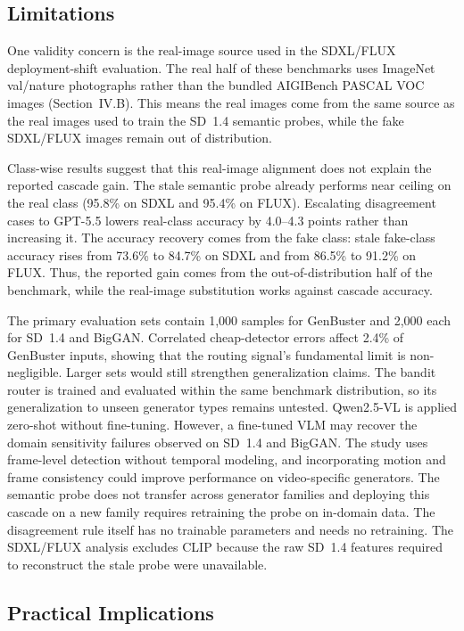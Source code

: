 \documentclass{ieeeaccess}
\begin{document}
\subsection{Limitations}

One validity concern is the real-image source used in the SDXL/FLUX deployment-shift
evaluation. The real half of these benchmarks uses ImageNet val/nature photographs
rather than the bundled AIGIBench PASCAL VOC images (Section~IV.B). This means the real
images come from the same source as the real images used to train the SD~1.4 semantic
probes, while the fake SDXL/FLUX images remain out of distribution.

Class-wise results suggest that this real-image alignment does not explain the reported
cascade gain. The stale semantic probe already performs near ceiling on the real class
(95.8\% on SDXL and 95.4\% on FLUX). Escalating disagreement cases to GPT-5.5 lowers
real-class accuracy by 4.0--4.3 points rather than increasing it. The accuracy recovery
comes from the fake class: stale fake-class accuracy rises from 73.6\% to 84.7\% on SDXL
and from 86.5\% to 91.2\% on FLUX. Thus, the reported gain comes from the
out-of-distribution half of the benchmark, while the real-image substitution works
against cascade accuracy.

The primary evaluation sets contain 1{,}000 samples for GenBuster and 2{,}000 each
for SD~1.4 and BigGAN. Correlated cheap-detector errors affect 2.4\% of GenBuster
inputs, showing that the routing signal's fundamental limit is non-negligible.
Larger sets would still strengthen generalization
claims. The bandit router is
trained and evaluated within the same benchmark distribution, so its generalization
to unseen generator types remains untested. Qwen2.5-VL is applied zero-shot without
fine-tuning. However, a fine-tuned VLM may recover the domain sensitivity failures observed on
SD~1.4 and BigGAN. The study uses frame-level detection without temporal modeling,
and incorporating motion and frame consistency could improve performance on
video-specific generators. The semantic probe does not transfer across generator
families and deploying this cascade on a new family requires retraining the probe on
in-domain data. The disagreement rule itself has no trainable parameters and needs
no retraining. The SDXL/FLUX analysis excludes CLIP because the raw SD~1.4 features
required to reconstruct the stale probe were unavailable.

\subsection{Practical Implications}
\end{document}
